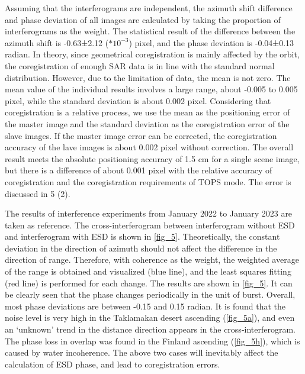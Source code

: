\documentclass[a4paper,fleqn]{cas-sc}
\begin{document}
\restoregeometry

Assuming that the interferograms are independent, the azimuth shift difference and phase deviation of all images are calculated by taking the proportion of interferograms as the weight. The statistical result of the difference between the azimuth shift is -0.63±2.12 ($*10^{-3}$) pixel, and the phase deviation is -0.04±0.13 radian. In theory, since geometrical coregistration is mainly affected by the orbit, the coregistration of enough SAR data is in line with the standard normal distribution. However, due to the limitation of data, the mean is not zero. The mean value of the individual results involves a large range, about -0.005 to 0.005 pixel, while the standard deviation is about 0.002 pixel. Considering that coregistration is a relative process, we use the mean as the positioning error of the master image and the standard deviation as the coregistration error of the slave images. If the master image error can be corrected, the coregistration accuracy of the lave images is about 0.002 pixel without correction. The overall result meets the absolute positioning accuracy of 1.5 cm for a single scene image, but there is a difference of about 0.001 pixel with the relative accuracy of coregistration and the coregistration requirements of TOPS mode. The error is discussed in 5 (2). \par

The results of interference experiments from January 2022 to January 2023 are taken as reference. The cross-interferogram between interferogram without ESD and interferogram with ESD is shown in \ref{fig_5}. Theoretically, the constant deviation in the direction of azimuth should not affect the difference in the direction of range. Therefore, with coherence as the weight, the weighted average of the range is obtained and visualized (blue line), and the least squares fitting (red line) is performed for each change. The results are shown in \ref{fig_5}. It can be clearly seen that the phase changes periodically in the unit of burst. Overall, most phase deviations are between -0.15 and 0.15 radian. It is found that the noise level is very high in the Taklamakan desert ascending (\ref{fig_5a}), and even an ‘unknown’ trend in the distance direction appears in the cross-interferogram. The phase loss in overlap was found in the Finland ascending (\ref{fig_5h}), which is caused by water incoherence. The above two cases will inevitably affect the calculation of ESD phase, and lead to coregistration errors. \par
\end{document}

